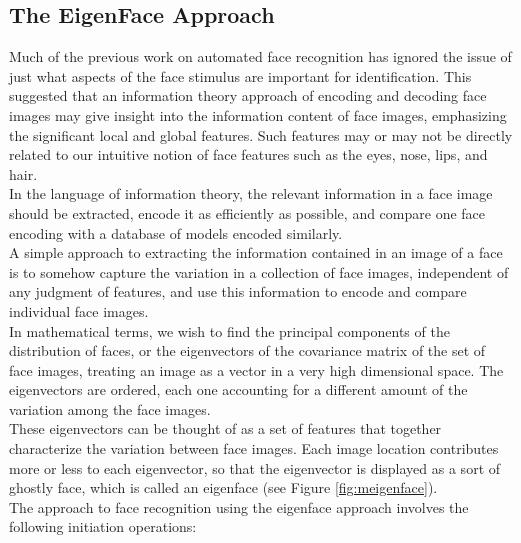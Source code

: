 \subsection{The EigenFace Approach}
Much of the previous work on automated face recognition has ignored the issue of
just what aspects of the face stimulus are important for identification.
This suggested that an information theory approach of encoding and decoding
face images may give insight into the information content of face images,
emphasizing the significant local and global features. Such features may or may not
be directly related to our intuitive notion of face features such as the eyes, nose,
lips, and hair. \\
In the language of information theory, the relevant information in a face image
should be extracted, encode it as efficiently as possible, and compare one face
encoding with a database of models encoded similarly. \\
A simple approach to extracting the information contained in an image of a face
is to somehow capture the variation in a collection of face images, independent
of any judgment of features, and use this information to encode and compare
individual face images. \\
In mathematical terms, we wish to find the principal components of the distribution of
faces, or the eigenvectors of the covariance matrix of the set of face images,
treating an image as a vector in a very high dimensional space. The eigenvectors
are ordered, each one accounting for a different amount of the variation among the face
images. \\
These eigenvectors can be thought of as a set of features that together characterize
the variation between face images. Each image location contributes more or less
to each eigenvector, so that the eigenvector is displayed as a sort of ghostly
face, which is called an eigenface (see Figure \ref{fig:meigenface}). \\
The approach to face recognition using the eigenface approach involves the
following initiation operations: \\
